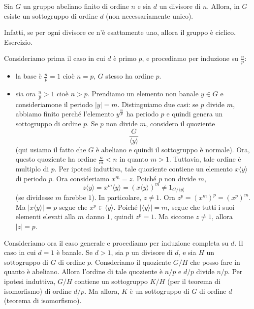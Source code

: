 \documentclass[a4paper]{article}
\begin{document}
\begin{snippettheorem}{}
    Sia \(G\) un gruppo abeliano finito
    di ordine \(n\) e sia \(d\) un divisore di \(n\).
    Allora, in \(G\) esiste un sottogruppo di ordine \(d\) (non necessariamente unico).
\end{snippettheorem}

Infatti, se per ogni divisore ce n'è esattamente uno, allora il gruppo è ciclico.
Esercizio.

\begin{snippetproof}{}
    Consideriamo prima il caso in cui \(d\) è primo \(p\), e procediamo per induzione
    su \(\frac{n}{p}\):
    \begin{itemize}
        \item la base è \(\frac{n}{p} = 1\) cioè \(n=p\), \(G\) stesso ha ordine \(p\).
        \item sia ora \(\frac{n}{p} > 1\) cioè \(n>p\). Prendiamo
        un elemento non banale \(y \in G\) e consideriamone il periodo \(|y| = m\).
        Distinguiamo due casi: se \(p\) divide \(m\), abbiamo finito perché l'elemento
        \(y^{\frac{m}{p}}\) ha periodo \(p\) e quindi genera un sottogruppo di ordine \(p\).
        Se \(p\) non divide \(m\), considero il quoziente
        \[
            \frac{G}{\langle y \rangle}
        \]
        (qui usiamo il fatto che \(G\) è abeliano e quindi il sottogruppo è normale).
        Ora, questo quoziente ha ordine \(\frac{n}{m} < n\) in quanto \(m > 1\).
        Tuttavia, tale ordine è multiplo di \(p\).
        Per ipotesi induttiva, tale quoziente contiene un elemento \(x\langle y \rangle\)
        di periodo \(p\). Ora consideriamo \(x^m = z\).
        Poiché \(p\) non divide \(m\), \[
            z \langle y \rangle = x^m \langle y \rangle
            = {(x \langle y \rangle)}^m \neq 1_{G / \langle y \rangle}
        \]
        (se dividesse \(m\) farebbe \(1\)).
        In particolare, \(z \neq 1\). Ora \(z^p = {(x^m)}^p = {(x^p)}^m\).
        Ma \(|x \langle y \rangle| = p\) segue che \(x^p \in \langle y \rangle\).
        Poiché \(|\langle y\rangle| = m\), segue che tutti i suoi elementi elevati alla \(m\)
        danno \(1\), quindi \(z^p = 1\). Ma siccome \(z \neq 1\), allora \(|z| = p\). \\
    \end{itemize}
    Consideriamo ora il caso generale e procediamo per induzione completa su \(d\).
    Il caso in cui \(d=1\) è banale.
    Se \(d>1\), sia \(p\) un divisore di \(d\),
    e sia \(H\) un sottogruppo di \(G\)
    di ordine \(p\). Consderiamo il quoziente \(G/H\) che posso fare in quanto è abeliano.
    Allora l'ordine di tale quoziente è \(n/p\) e \(d/p\) divide \(n/p\).
    Per ipotesi induttiva, \(G/H\) contiene un sottogruppo \(K/H\)
    (per il teorema di isomorfismo) di ordine \(d/p\).
    Ma allora, \(K\) è un sottogruppo di \(G\) di ordine \(d\) (teorema di isomorfismo).
\end{snippetproof}
\end{document}
